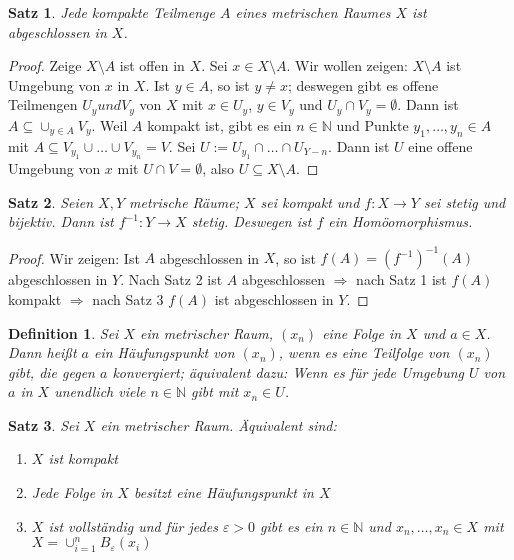 \documentclass[10pt,a4paper]{report}
\newtheorem{satz}{Satz}
\newtheorem*{defi}{Definition}
\begin{document}
\begin{satz}
  Jede kompakte Teilmenge $A$ eines metrischen Raumes $X$ ist abgeschlossen in $X$.
\end{satz}

\begin{proof}
  Zeige $X \setminus A$ ist offen in $X$.
  Sei $x \in X \setminus A$.
  Wir wollen zeigen: $X \setminus A$ ist Umgebung von $x$ in $X$.
  Ist $y \in A$, so ist $y \ne x$; deswegen gibt es offene Teilmengen $U_{y} und V_{y}$ von $X$ mit $x \in U_{y}$, $y \in V_{y}$ und $U_{y} \cap V_{y} = \emptyset$.
  Dann ist $A \subseteq \cup_{y \in A} V_{y}$.
  Weil $A$ kompakt ist, gibt es ein $n \in \mathbb{N}$ und Punkte $y_{1}, \dots, y_{n} \in A$ mit $A \subseteq V_{y_{1}} \cup \dots \cup V_{y_{n}} = V$.
  Sei $U := U_{y_{1}} \cap \dots \cap U_{Y-n}$.
  Dann ist $U$ eine offene Umgebung von $x$ mit $U \cap V = \emptyset$, also $U \subseteq X \setminus A$.
\end{proof}

\begin{satz}
  Seien $X, Y$ metrische Räume; $X$ sei kompakt und $f : X \rightarrow Y$ sei stetig und bijektiv.
  Dann ist $f^{-1} : Y \rightarrow X$ stetig.
  Deswegen ist $f$ ein Homöomorphismus.
\end{satz}

\begin{proof}
  Wir zeigen: Ist $A$ abgeschlossen in $X$, so ist $f(A) = (f^{-1})^{-1}(A)$ abgeschlossen in $Y$.
  Nach Satz 2 ist $A$ abgeschlossen $\Rightarrow$ nach Satz 1 ist $f(A)$ kompakt $\Rightarrow$ nach Satz 3 $f(A)$ ist abgeschlossen in $Y$.
\end{proof}

\begin{defi}
  Sei $X$ ein metrischer Raum, $(x_{n})$ eine Folge in $X$ und $a \in X$.
  Dann heißt $a$ ein Häufungspunkt von $(x_{n})$, wenn es eine Teilfolge von $(x_{n})$ gibt, die gegen $a$ konvergiert; äquivalent dazu: Wenn es für jede Umgebung $U$ von $a$ in $X$ unendlich viele $n \in \mathbb{N}$ gibt mit $x_{n} \in U$.
\end{defi}

\begin{satz}
  Sei $X$ ein metrischer Raum.
  Äquivalent sind:
  \begin{enumerate}[label={\alph*)}]
  \item $X$ ist kompakt
  \item Jede Folge in $X$ besitzt eine Häufungspunkt in $X$
  \item $X$ ist vollständig und für jedes $\varepsilon > 0$ gibt es ein $n \in \mathbb{N}$ und $x_{n}, \dots, x_{n} \in X$ mit $X = \cup_{i = 1}^{n} B_{\varepsilon}(x_{i})$
  \end{enumerate}
\end{satz}
\end{document}
